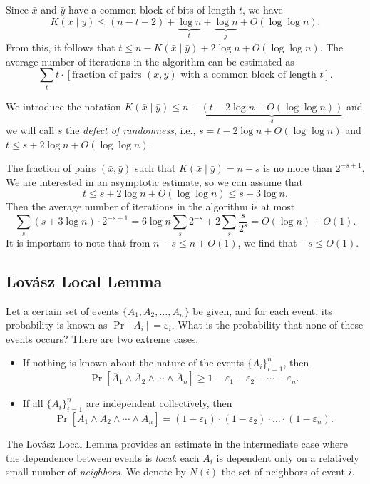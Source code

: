 \documentclass[12pt,sans]{article}
\newcommand{\seqn}[2]{{#1}_1,{#1}_2,\dotsc,{#1}_{#2}}
\theoremstyle{definition}
\theoremstyle{plain}
\theoremstyle{remark}
\begin{document}
Since $\bar x$ and $\bar y$ have a common block of bits of length $t$, we have
\[
K(\bar x \mid \bar y) \le (n - t - 2) + \underbrace{\log n}_{t} + \underbrace{\log n}_{j} + O(\log\log n).
\]
From this, it follows that $t \le n - K(\bar x \mid \bar y) + 2\log n + O(\log\log n)$. The average number of iterations in the algorithm can be estimated as
\[
\sum_t t \cdot [\text{fraction of pairs $(x, y)$ with a common block of length $t$}].
\]

We introduce the notation
$K(\bar x \mid \bar y) \le n - \underbrace{(t - 2\log n - O(\log\log n))}_{s}$ and we will call $s$ the \emph{defect of randomness}, i.e., $s = t - 2\log n + O(\log\log n)$ and $t \le s + 2\log n + O(\log\log n)$.

The fraction of pairs $(\bar x, \bar y)$ such that $K(\bar x \mid \bar y) = n - s$ is no more than $2^{-s + 1}$. We are interested in an asymptotic estimate, so we can assume that
\[
t \le s + 2\log n + O(\log\log n) \le s + 3\log n.
\]
Then the average number of iterations in the algorithm is at most
\[
\sum_s (s + 3\log n) \cdot 2^{-s + 1} = 6\log n \sum_s 2^{-s} + 2 \sum_s \frac{s}{2^s}
= O(\log n) + O(1).
\]
It is important to note that from $n - s \le n + O(1)$, we find that $-s \le O(1)$.

\subsection{Lovász Local Lemma}
Let a certain set of events $\{\seqn{A}{n}\}$ be given, and for each event, its probability is known as $\Pr[A_i] = \varepsilon_i$. What is the probability that none of these events occurs? There are two extreme cases.

\begin{itemize}
    \item If nothing is known about the nature of the events $\{A_i\}_{i=1}^n$, then
    \[
    \Pr[\overline{A}_1\land\overline{A}_2\land\dotsb\land\overline{A}_n]
    \ge 1 - \varepsilon_1 - \varepsilon_2 -\dotsb -\varepsilon_n.
    \]

    \item If all $\{A_i\}_{i=1}^n$ are independent collectively, then
    \[
    \Pr[\overline{A}_1\land\overline{A}_2\land\dotsb\land\overline{A}_n]
    = (1 - \varepsilon_1)\cdot(1 - \varepsilon_2) \cdot\dotso\cdot (1 - \varepsilon_n).
    \]
\end{itemize}

The Lovász Local Lemma provides an estimate in the intermediate case where the dependence between events is \emph{local}: each $A_i$ is dependent only on a relatively small number of \emph{neighbors}. We denote by $N(i)$ the set of neighbors of event $i$.
\end{document}
